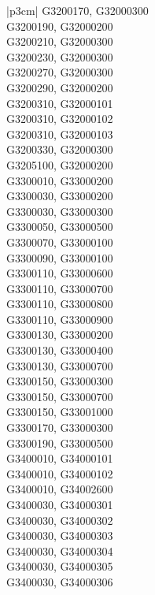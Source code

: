 \begin{customLongTable}{ |p{3cm}| }
G3200170, G32000300 \\ \hline
G3200190, G32000200 \\ \hline
G3200210, G32000300 \\ \hline
G3200230, G32000300 \\ \hline
G3200270, G32000300 \\ \hline
G3200290, G32000200 \\ \hline
G3200310, G32000101 \\ \hline
G3200310, G32000102 \\ \hline
G3200310, G32000103 \\ \hline
G3200330, G32000300 \\ \hline
G3205100, G32000200 \\ \hline
G3300010, G33000200 \\ \hline
G3300030, G33000200 \\ \hline
G3300030, G33000300 \\ \hline
G3300050, G33000500 \\ \hline
G3300070, G33000100 \\ \hline
G3300090, G33000100 \\ \hline
G3300110, G33000600 \\ \hline
G3300110, G33000700 \\ \hline
G3300110, G33000800 \\ \hline
G3300110, G33000900 \\ \hline
G3300130, G33000200 \\ \hline
G3300130, G33000400 \\ \hline
G3300130, G33000700 \\ \hline
G3300150, G33000300 \\ \hline
G3300150, G33000700 \\ \hline
G3300150, G33001000 \\ \hline
G3300170, G33000300 \\ \hline
G3300190, G33000500 \\ \hline
G3400010, G34000101 \\ \hline
G3400010, G34000102 \\ \hline
G3400010, G34002600 \\ \hline
G3400030, G34000301 \\ \hline
G3400030, G34000302 \\ \hline
G3400030, G34000303 \\ \hline
G3400030, G34000304 \\ \hline
G3400030, G34000305 \\ \hline
G3400030, G34000306 \\ \hline

\end{customLongTable}
